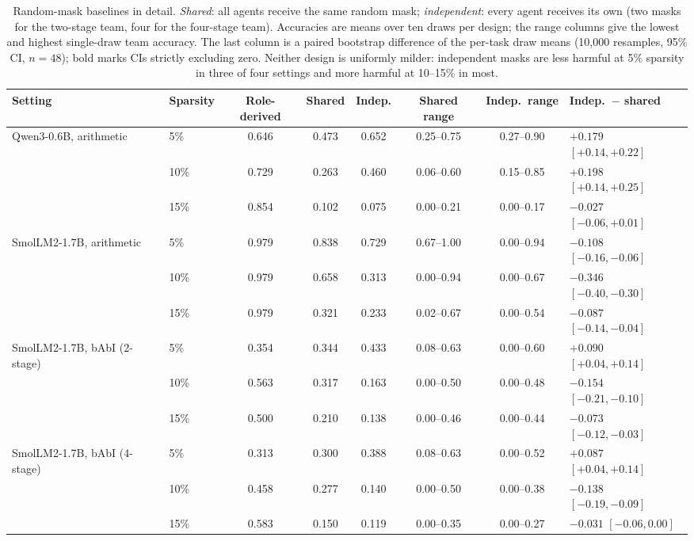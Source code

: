 \begin{table}[t]
\centering
\caption{Random-mask baselines in detail. \emph{Shared}: all agents receive the same random mask;
\emph{independent}: every agent receives its own (two masks for the two-stage team, four for the
four-stage team). Accuracies are means over ten draws per design; the range columns give the
lowest and highest single-draw team accuracy. The last column is a paired bootstrap difference of
the per-task draw means (10{,}000 resamples, 95\% CI, $n=48$); bold marks CIs strictly excluding
zero. Neither design is uniformly milder: independent masks are less harmful at 5\% sparsity in
three of four settings and more harmful at 10--15\% in most.}
\label{tab:indeprand}
\small
\begin{tabular}{llccccc l}
\toprule
Setting & Sparsity & Role-derived & Shared & Indep. & Shared range & Indep.\ range & Indep.\ $-$ shared \\
\midrule
Qwen3-0.6B, arithmetic & 5\% & 0.646 & 0.473 & 0.652 & 0.25--0.75 & 0.27--0.90 & $\mathbf{+0.179}$ {\scriptsize $[+0.14, +0.22]$} \\
 & 10\% & 0.729 & 0.263 & 0.460 & 0.06--0.60 & 0.15--0.85 & $\mathbf{+0.198}$ {\scriptsize $[+0.14, +0.25]$} \\
 & 15\% & 0.854 & 0.102 & 0.075 & 0.00--0.21 & 0.00--0.17 & $-0.027$ {\scriptsize $[-0.06, +0.01]$} \\
\addlinespace
SmolLM2-1.7B, arithmetic & 5\% & 0.979 & 0.838 & 0.729 & 0.67--1.00 & 0.00--0.94 & $\mathbf{-0.108}$ {\scriptsize $[-0.16, -0.06]$} \\
 & 10\% & 0.979 & 0.658 & 0.313 & 0.00--0.94 & 0.00--0.67 & $\mathbf{-0.346}$ {\scriptsize $[-0.40, -0.30]$} \\
 & 15\% & 0.979 & 0.321 & 0.233 & 0.02--0.67 & 0.00--0.54 & $\mathbf{-0.087}$ {\scriptsize $[-0.14, -0.04]$} \\
\addlinespace
SmolLM2-1.7B, bAbI (2-stage) & 5\% & 0.354 & 0.344 & 0.433 & 0.08--0.63 & 0.00--0.60 & $\mathbf{+0.090}$ {\scriptsize $[+0.04, +0.14]$} \\
 & 10\% & 0.563 & 0.317 & 0.163 & 0.00--0.50 & 0.00--0.48 & $\mathbf{-0.154}$ {\scriptsize $[-0.21, -0.10]$} \\
 & 15\% & 0.500 & 0.210 & 0.138 & 0.00--0.46 & 0.00--0.44 & $\mathbf{-0.073}$ {\scriptsize $[-0.12, -0.03]$} \\
\addlinespace
SmolLM2-1.7B, bAbI (4-stage) & 5\% & 0.313 & 0.300 & 0.388 & 0.08--0.63 & 0.00--0.52 & $\mathbf{+0.087}$ {\scriptsize $[+0.04, +0.14]$} \\
 & 10\% & 0.458 & 0.277 & 0.140 & 0.00--0.50 & 0.00--0.38 & $\mathbf{-0.138}$ {\scriptsize $[-0.19, -0.09]$} \\
 & 15\% & 0.583 & 0.150 & 0.119 & 0.00--0.35 & 0.00--0.27 & $\mathbf{-0.031}$ {\scriptsize $[-0.06, 0.00]$} \\
\bottomrule
\end{tabular}
\end{table}
